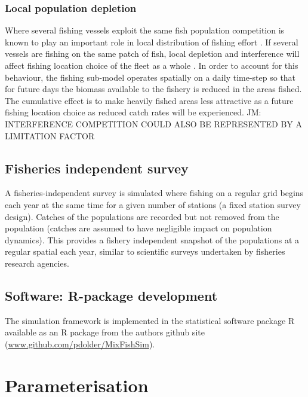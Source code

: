 \documentclass[review]{elsarticle}
\begin{document}
\subsubsection{Local population depletion}

Where several fishing vessels exploit the same fish population competition is
known to play an important role in local distribution of fishing effort
\citep{Gillis1998}. If several vessels are fishing on the same patch of fish,
local depletion and interference  will affect fishing
location choice of the fleet as a whole \citep{Rijnsdorp2000, Poos2007a}. In
order to account for this behaviour, the fishing sub-model operates spatially
on a daily time-step so that for future days the biomass available to the
fishery is reduced in the areas fished. The cumulative effect is to make
heavily fished areas less attractive as a future fishing location choice as
reduced catch rates will be experienced. JM: INTERFERENCE COMPETITION COULD
ALSO BE REPRESENTED BY A LIMITATION FACTOR 

\subsection{Fisheries independent survey}

A fisheries-independent survey is simulated where fishing on a regular grid
begins each year at the same time for a given number of stations (a fixed
station survey design). Catches of the populations  are recorded but not removed from the population
(catches are assumed to have negligible impact on population dynamics). This
provides a fishery independent snapshot of the populations at a regular spatial
 each year, similar to scientific
surveys undertaken by fisheries research agencies. \\

\subsection{Software: R-package development}

The simulation framework is implemented in the statistical software package R
\citep{RCoreTeam2017}  available as an R package from
the authors github site (\url{www.github.com/pdolder/MixFishSim}).\\

\section{Parameterisation}
\end{document}
